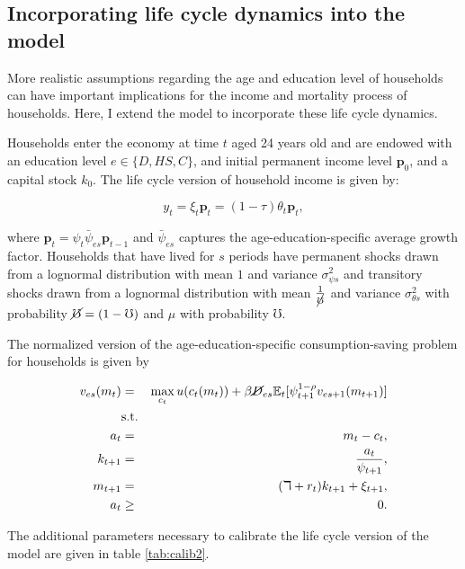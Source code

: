 \subsection{Incorporating life cycle dynamics into the model}

\par More realistic assumptions regarding the age and education level of households can have important implications for the income and mortality process of households. Here, I extend the model to incorporate these life cycle dynamics.

\par Households enter the economy at time $t$ aged 24 years old and are endowed with an education level $e \in \{D,HS,C\}$, and initial permanent income level $\textbf{p}_0$, and a capital stock $k_0$. The life cycle version of household income is given by:

$$ y_t = \xi_t \textbf{p}_t = (1 - \tau) \theta_t \textbf{p}_t, $$

where $\textbf{p}_t = \psi_t \bar{\psi}_{es} \textbf{p}_{t-1}$ and $\bar{\psi}_{es}$ captures the age-education-specific average growth factor. Households that have lived for $s$ periods have permanent shocks drawn from a lognormal distribution with mean $1$ and variance $\sigma^{2}_{\psi s}$ and transitory shocks drawn from a lognormal distribution with mean $\frac{1}{\cancel{\mho}}$ and variance $\sigma^{2}_{\theta s}$ with probability $\cancel{\mho} = (1-\mho)$ and $\mu$ with probability $\mho$.

\par The normalized version of the age-education-specific consumption-saving problem for households is given by

\begin{eqnarray*}
  v_{es}(m_t) &=& \max_{c_t} u(c_t(m_t)) + \beta \cancel{D}_{es} \mathbb{E}_{t}[\psi_{t+1}^{1-\rho}v_{es + 1}(m_{t+1})] \\
  &\text{s.t.}& \\
  a_t &=& m_t - c_t, \\
  k_{t+1} &=& \frac{a_t}{\psi_{t+1}}, \\
  m_{t+1} &=& (\daleth + r_t)k_{t+1} + \xi_{t+1}, \\
  a_t &\geq& 0.
\end{eqnarray*}

\par The additional parameters necessary to calibrate the life cycle version of the model are given in table \ref{tab:calib2}.

